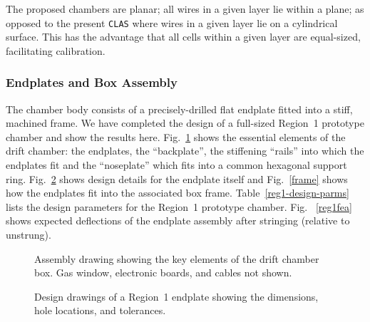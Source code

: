 \documentclass[12pt]{article}
\begin{document}
The proposed chambers are planar; all wires in a given layer lie within
a plane; as opposed to the present {\tt CLAS} where wires in a given layer 
lie on a cylindrical surface.  This has the advantage that all cells 
within a given layer are equal-sized, facilitating calibration.

\subsubsection{Endplates and Box Assembly}

The chamber body consists of a precisely-drilled flat endplate fitted into a 
stiff, machined frame.  We have completed the design of a full-sized Region~1 
prototype chamber and show the results here.  Fig.~\ref{dcassy} shows the 
essential elements of the drift chamber: the endplates, the ``backplate'', the 
stiffening ``rails'' into which the endplates fit and the ``noseplate'' which 
fits into a common hexagonal support ring.  Fig.~\ref{endplate} shows design 
details for the endplate itself and Fig.~\ref{frame} shows how the endplates 
fit into the associated box frame.  Table~\ref{reg1-design-parms} lists the 
design parameters for the Region~1 prototype chamber.  Fig. ~\ref{reg1fea} 
shows expected deflections of the endplate assembly after stringing (relative 
to unstrung).

\begin{figure}[htbp]
\vspace{9.0cm}
\caption{\small{Assembly drawing showing the key elements of the drift
chamber box.  Gas window, electronic boards, and cables not shown.}}
\label{dcassy}
\end{figure}

\begin{figure}[htbp]
\vspace{21.0cm}
\caption{\small{Design drawings of a Region~1 endplate showing the dimensions,
hole locations, and tolerances.}}
\label{endplate}
\end{figure}
\end{document}
